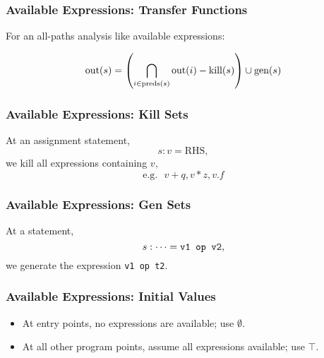 \documentclass{beamer}
\begin{document}
\begin{frame}
  \frametitle{Available Expressions: Transfer Functions}

For an all-paths analysis like available expressions:

\[ \mbox{out}(s) = \left( \bigcap_{i \in \mbox{\scriptsize preds}(s)} 
\mbox{out}(i) - \mbox{kill}(s) \right) \cup \mbox{gen}(s)
\]
\end{frame}

\begin{frame}
  \frametitle{Available Expressions: Kill Sets}

At an assignment statement,
\[ s: v = \mbox{RHS}, \]
we kill all expressions containing $v$,
\[ \mbox{e.g.~~} v + q, v * z, v.f \]
\end{frame}

\begin{frame}
  \frametitle{Available Expressions: Gen Sets}

At a statement,
\[ s: \cdots = \mbox{\tt v1 op v2}, \]
we generate the expression {\tt v1 op t2}.
\end{frame}

\begin{frame}
  \frametitle{Available Expressions: Initial Values}

\Large
\begin{itemize}
\item At entry points, no expressions are available; use $\emptyset$.
\item At all other program points, assume all expressions available; use $\top$.
\end{itemize}
\end{frame}
\end{document}
